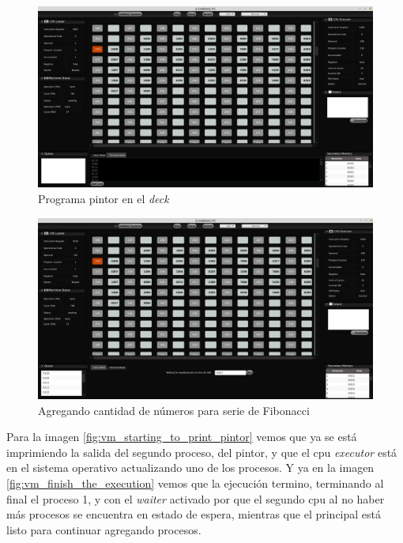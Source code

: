 \documentclass[letterpaper,12pt,oneside]{book}
\begin{document}
			\begin{figure}[H]		
				\centering
				\includegraphics[scale=0.26]{media/Paralela/vm_add_pintor_deck.png}
				\caption{Programa pintor en el \textit{deck}} 
				\label{fig:vm_add_pintor_deck}
			\end{figure}
			
			\begin{figure}[h]		
				\centering
				\includegraphics[scale=0.26]{media/Paralela/vm_fibonacci_putting_numer_of_digits.png}
				\caption{Agregando cantidad de números para serie de Fibonacci}
				\label{fig:vm_fibonacci_putting_numer_of_digits}
			\end{figure}
			
			
			Para la imagen \ref{fig:vm_starting_to_print_pintor} vemos que ya se está imprimiendo la salida del segundo proceso, del pintor, y
			que el cpu \textit{executor} está en el sistema operativo actualizando uno de los procesos. Y ya en la imagen 
			\ref{fig:vm_finish_the_execution} vemos que la ejecución termino, terminando al final el proceso 1, y con el \textit{waiter}
			activado por que el segundo cpu al no haber más procesos se encuentra en estado de espera, mientras que el principal
			está listo para continuar agregando procesos. 
			
\end{document}
